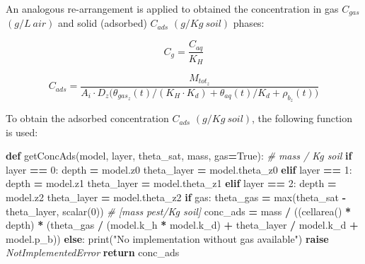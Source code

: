 \documentclass[]{article}
\newenvironment{Shaded}{\begin{snugshade}}{\end{snugshade}}
\newcommand{\KeywordTok}[1]{\textcolor[rgb]{0.13,0.29,0.53}{\textbf{#1}}}
\newcommand{\DecValTok}[1]{\textcolor[rgb]{0.00,0.00,0.81}{#1}}
\newcommand{\StringTok}[1]{\textcolor[rgb]{0.31,0.60,0.02}{#1}}
\newcommand{\CommentTok}[1]{\textcolor[rgb]{0.56,0.35,0.01}{\textit{#1}}}
\newcommand{\VariableTok}[1]{\textcolor[rgb]{0.00,0.00,0.00}{#1}}
\newcommand{\ControlFlowTok}[1]{\textcolor[rgb]{0.13,0.29,0.53}{\textbf{#1}}}
\newcommand{\OperatorTok}[1]{\textcolor[rgb]{0.81,0.36,0.00}{\textbf{#1}}}
\newcommand{\BuiltInTok}[1]{#1}
\newcommand{\PreprocessorTok}[1]{\textcolor[rgb]{0.56,0.35,0.01}{\textit{#1}}}
\newcommand{\NormalTok}[1]{#1}
\begin{document}
An analogous re-arrangement is applied to obtained the concentration in
gas \(C_{gas}\) \((g/L~air)\) and solid (adsorbed) \(C_{ads}\)
\((g/Kg~soil)\) phases:

\begin{equation}
C_{g} = \frac{C_{aq}}{K_H} 
\label{eq:conc_gas}  
\end{equation}

\begin{equation}
C_{ads} = \frac{M_{tot_z} }{ A_i\cdot D_z \Big( \theta_{gas_z}(t)/(K_H \cdot K_d) + \theta_{aq}(t)/K_d + \rho_{b_z}(t)\Big)}
\label{eq:mass_tot_conc_aq2}  
\end{equation}

To obtain the adsorbed concentration \(C_{ads}\) \((g/Kg~soil)\), the
following function is used:

\begin{Shaded}
\begin{Highlighting}[]
\KeywordTok{def}\NormalTok{ getConcAds(model, layer, theta_sat, mass, gas}\OperatorTok{=}\VariableTok{True}\NormalTok{):}
    \CommentTok{# mass / Kg soil}
    \ControlFlowTok{if}\NormalTok{ layer }\OperatorTok{==} \DecValTok{0}\NormalTok{:}
\NormalTok{        depth }\OperatorTok{=}\NormalTok{ model.z0}
\NormalTok{        theta_layer }\OperatorTok{=}\NormalTok{ model.theta_z0}
    \ControlFlowTok{elif}\NormalTok{ layer }\OperatorTok{==} \DecValTok{1}\NormalTok{:}
\NormalTok{        depth }\OperatorTok{=}\NormalTok{ model.z1}
\NormalTok{        theta_layer }\OperatorTok{=}\NormalTok{ model.theta_z1}
    \ControlFlowTok{elif}\NormalTok{ layer }\OperatorTok{==} \DecValTok{2}\NormalTok{:}
\NormalTok{        depth }\OperatorTok{=}\NormalTok{ model.z2}
\NormalTok{        theta_layer }\OperatorTok{=}\NormalTok{ model.theta_z2}
    \ControlFlowTok{if}\NormalTok{ gas:}
\NormalTok{        theta_gas }\OperatorTok{=} \BuiltInTok{max}\NormalTok{(theta_sat }\OperatorTok{-}\NormalTok{ theta_layer, scalar(}\DecValTok{0}\NormalTok{))}
        \CommentTok{# [mass pest/Kg soil]}
\NormalTok{        conc_ads }\OperatorTok{=}\NormalTok{ mass }\OperatorTok{/}\NormalTok{ ((cellarea() }\OperatorTok{*}\NormalTok{ depth) }\OperatorTok{*}
\NormalTok{                           (theta_gas }\OperatorTok{/}\NormalTok{ (model.k_h }\OperatorTok{*}\NormalTok{ model.k_d) }\OperatorTok{+}
\NormalTok{                            theta_layer }\OperatorTok{/}\NormalTok{ model.k_d }\OperatorTok{+}
\NormalTok{                            model.p_b))}
    \ControlFlowTok{else}\NormalTok{:}
        \BuiltInTok{print}\NormalTok{(}\StringTok{"No implementation without gas available"}\NormalTok{)}
        \ControlFlowTok{raise} \PreprocessorTok{NotImplementedError}
    \ControlFlowTok{return}\NormalTok{ conc_ads}
\end{Highlighting}
\end{Shaded}
\end{document}
